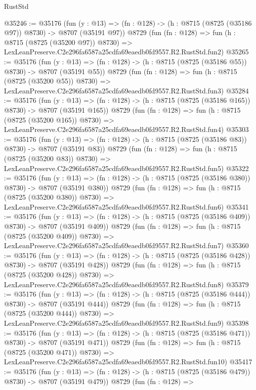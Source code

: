 \begin{lexlean}{RustStd}
\begin{coremodule}
@35246 := @35176
    (fun (y : @13) => (fn : @128) -> (h : @8715 (@8725 (@35186 @97)) @8730) -> @8707 (@35191 @97))
    @8729
    (fun (fn : @128) =>
    fun (h : @8715 (@8725 (@35200 @97)) @8730) =>
    LexLeanPreserve.C2e296fa6587a25cdfa69eaedb0fd9557.R2.RustStd.fun2)
@35265 := @35176
    (fun (y : @13) => (fn : @128) -> (h : @8715 (@8725 (@35186 @55)) @8730) -> @8707 (@35191 @55))
    @8729
    (fun (fn : @128) =>
    fun (h : @8715 (@8725 (@35200 @55)) @8730) =>
    LexLeanPreserve.C2e296fa6587a25cdfa69eaedb0fd9557.R2.RustStd.fun3)
@35284 := @35176
    (fun (y : @13) => (fn : @128) -> (h : @8715 (@8725 (@35186 @165)) @8730) -> @8707 (@35191 @165))
    @8729
    (fun (fn : @128) =>
    fun (h : @8715 (@8725 (@35200 @165)) @8730) =>
    LexLeanPreserve.C2e296fa6587a25cdfa69eaedb0fd9557.R2.RustStd.fun4)
@35303 := @35176
    (fun (y : @13) => (fn : @128) -> (h : @8715 (@8725 (@35186 @83)) @8730) -> @8707 (@35191 @83))
    @8729
    (fun (fn : @128) =>
    fun (h : @8715 (@8725 (@35200 @83)) @8730) =>
    LexLeanPreserve.C2e296fa6587a25cdfa69eaedb0fd9557.R2.RustStd.fun5)
@35322 := @35176
    (fun (y : @13) => (fn : @128) -> (h : @8715 (@8725 (@35186 @380)) @8730) -> @8707 (@35191 @380))
    @8729
    (fun (fn : @128) =>
    fun (h : @8715 (@8725 (@35200 @380)) @8730) =>
    LexLeanPreserve.C2e296fa6587a25cdfa69eaedb0fd9557.R2.RustStd.fun6)
@35341 := @35176
    (fun (y : @13) => (fn : @128) -> (h : @8715 (@8725 (@35186 @409)) @8730) -> @8707 (@35191 @409))
    @8729
    (fun (fn : @128) =>
    fun (h : @8715 (@8725 (@35200 @409)) @8730) =>
    LexLeanPreserve.C2e296fa6587a25cdfa69eaedb0fd9557.R2.RustStd.fun7)
@35360 := @35176
    (fun (y : @13) => (fn : @128) -> (h : @8715 (@8725 (@35186 @428)) @8730) -> @8707 (@35191 @428))
    @8729
    (fun (fn : @128) =>
    fun (h : @8715 (@8725 (@35200 @428)) @8730) =>
    LexLeanPreserve.C2e296fa6587a25cdfa69eaedb0fd9557.R2.RustStd.fun8)
@35379 := @35176
    (fun (y : @13) => (fn : @128) -> (h : @8715 (@8725 (@35186 @444)) @8730) -> @8707 (@35191 @444))
    @8729
    (fun (fn : @128) =>
    fun (h : @8715 (@8725 (@35200 @444)) @8730) =>
    LexLeanPreserve.C2e296fa6587a25cdfa69eaedb0fd9557.R2.RustStd.fun9)
@35398 := @35176
    (fun (y : @13) => (fn : @128) -> (h : @8715 (@8725 (@35186 @471)) @8730) -> @8707 (@35191 @471))
    @8729
    (fun (fn : @128) =>
    fun (h : @8715 (@8725 (@35200 @471)) @8730) =>
    LexLeanPreserve.C2e296fa6587a25cdfa69eaedb0fd9557.R2.RustStd.fun10)
@35417 := @35176
    (fun (y : @13) => (fn : @128) -> (h : @8715 (@8725 (@35186 @479)) @8730) -> @8707 (@35191 @479))
    @8729
    (fun (fn : @128) =>

\end{coremodule}
\end{lexlean}
